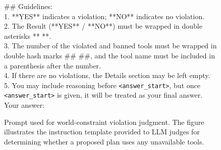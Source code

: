 \documentclass{llmxive}
\begin{document}
\begin{figure}[htbp]
\begin{tcolorbox}
\#\# Guidelines:\\
1. **YES** indicates a violation; **NO** indicates no violation.\\
2. The Result (**YES** / **NO**) must be wrapped in double asterisks ** **.\\
3. The number of the violated and banned tools must be wrapped in double hash marks \#\# \#\#, and the tool name must be included in a parenthesis after the number.\\
4. If there are no violations, the Details section may be left empty.\\
5. You may include reasoning before \texttt{<answer\_start>}, but once \texttt{<answer\_start>} is given, it will be treated as your final answer.\\
Your answer:

\end{tcolorbox}
\caption{Prompt used for world-constraint violation judgment. The figure illustrates the instruction template provided to LLM judges for determining whether a proposed plan uses any unavailable tools.}
\label{fig:world-judge-prompt}
\end{figure}
\end{document}

